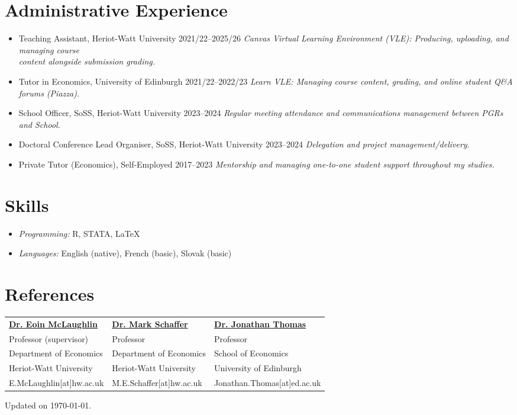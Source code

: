\documentclass[11pt,a4paper]{article}
\begin{document}
\section{Administrative Experience}
\begin{itemize}
    \item [] Teaching Assistant, Heriot-Watt University \hfill 2021/22--2025/26
    \textit{\newline Canvas Virtual Learning Environment (VLE): Producing, uploading, and managing course\\ content alongside submission grading.}
    \item [] Tutor in Economics, University of Edinburgh \hfill 2021/22--2022/23
    \textit{\newline Learn VLE: Managing course content, grading, and online student Q\&A forums (Piazza).}
    \item [] School Officer, SoSS, Heriot-Watt University \hfill 2023--2024
    \textit{\newline Regular meeting attendance and communications management between PGRs and School.}
    \item [] Doctoral Conference Lead Organiser, SoSS, Heriot-Watt University \hfill 2023--2024
    \textit{\newline Delegation and project management/delivery.}
    \item [] Private Tutor (Economics), Self-Employed \hfill  2017--2023
    \textit{\newline Mentorship and managing one-to-one student support throughout my studies.}
\end{itemize}

\section{Skills}
\begin{itemize}
    \item [] \textit{Programming:} R, STATA, LaTeX
    \item [] \textit{Languages:} English (native), French (basic), Slovak (basic)
\end{itemize}

\section{References}
\begin{tabular}{@{}p{5cm}p{5cm}p{5cm}@{}}
\href{https://www.eoinmclaughlin.ie/}{\textbf{Dr. Eoin McLaughlin}} & \href{https://www.hw.ac.uk/profiles/uk/school/ebs/faculty/mark-schaffer}{\textbf{Dr. Mark Schaffer}} &  \href{https://edwebprofiles.ed.ac.uk/profile/jonathan-thomas}{\textbf{Dr. Jonathan Thomas}} \\
Professor (supervisor) & Professor & Professor \\
Department of Economics & Department of Economics & School of Economics \\
Heriot-Watt University & Heriot-Watt University & University of Edinburgh \\
E.McLaughlin[at]hw.ac.uk & M.E.Schaffer[at]hw.ac.uk & Jonathan.Thomas[at]ed.ac.uk\\
\end{tabular}

\vfill
\begin{flushright}
\footnotesize Updated on \today.
\end{flushright}
\end{document}
